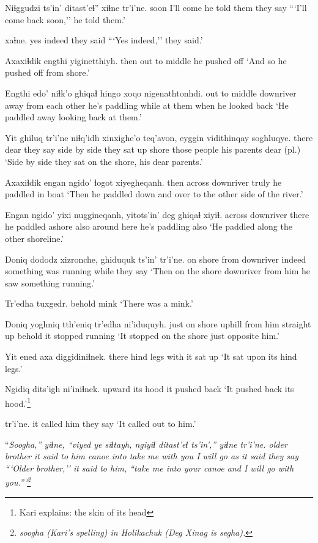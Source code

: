 \documentclass[12pt]{article}
\begin{document}
\gll Niɬggudzi ts'in' ditast'eɬ'' xiɬne  tr'i'ne.
soon {} {I'll come} {he told them} {they say}
\glt ```I'll come back soon,'' he told them.'
\glend

  xaɬne.
{yes indeed} {they said}
\glt ```Yes indeed,'' they said.'
\glend

\gll Axaxiɬdik engthi yiginetthiyh.
then  {out to middle} {he pushed off}
\glt `And so he pushed off from shore.'
\glend

\gll Engthi edo' niɬk'o ghiqaɬ hingo  xoqo nigenathtonhdi.
{out to middle} downriver {away from each other} {he's paddling} while {at them} {when he looked back}
\glt `He paddled away looking back at them.'
\glend

\gll Yit ghiluq tr'i'ne niɬq'idh xinxighe'o teq'avon, eyggin vidithinqay soghluqye.
there dear {they say} {side by side} {they sat up} shore {those people} {his parents} {dear (pl.)}
\glt `Side by side they sat on the shore, his dear parents.'
\glend

\gll Axaxiɬdik engan  ngido' ɬogot xiyegheqanh. 
then  across  downriver truly {he paddled in boat}
\glt `Then he paddled down and over to the other side of the river.'
\glend

\gll Engan ngido' yixi nuggineqanh, yitots'in' deg ghiqaɬ  xiyiɬ.
across downriver there {he paddled ashore} also  {around here} {he's paddling} also
\glt `He paddled along the other shoreline.'
\glend

\gll Doniq dododz  xizronche, ghiduquk ts'in'  tr'i'ne.
{on shore} {from downriver} indeed {something was running} while {they say}
\glt `Then on the shore downriver from him he saw something running.'
\glend

\gll Tr'edha tuxgedr.
behold  mink
\glt `There was a mink.'
\glend

\gll Doniq yoghniq  tth'eniq tr'edha ni'iduquyh.
{just on shore} {uphill from him} {straight up} behold {it stopped running}
\glt `It stopped on the shore just opposite him.'
\glend

\gll Yit ened axa  diggidiniɬnek.
there {hind legs} with {it sat up}
\glt `It sat upon its hind legs.'
\glend

\gll Ngidiq dits'igh ni'iniɬnek.
upward  {its hood} {it pushed back}
\glt `It pushed back its hood.'\footnote{Kari explains:  the skin of its head}
\glend

 tr'i'ne.
{it called him} {they say}
\glt `It called out to him.'
\glend

\gll ``\em Soogha,'' \em yiɬne, ``viyed ye siɬtayh, ngiyiɬ  ditast'eɬ ts'in','' yiɬne tr'i'ne.
{older brother} {it said to him} canoe into {take me} {with you} {I will go} as  {it said} {they say}
\glt ```Older brother,'' it said to him, ``take me into your canoe and I will go with you.'''\footnote{\em soogha \em (Kari's spelling) in Holikachuk (Deg Xinag is \em segha).}
\glend
\end{document}
